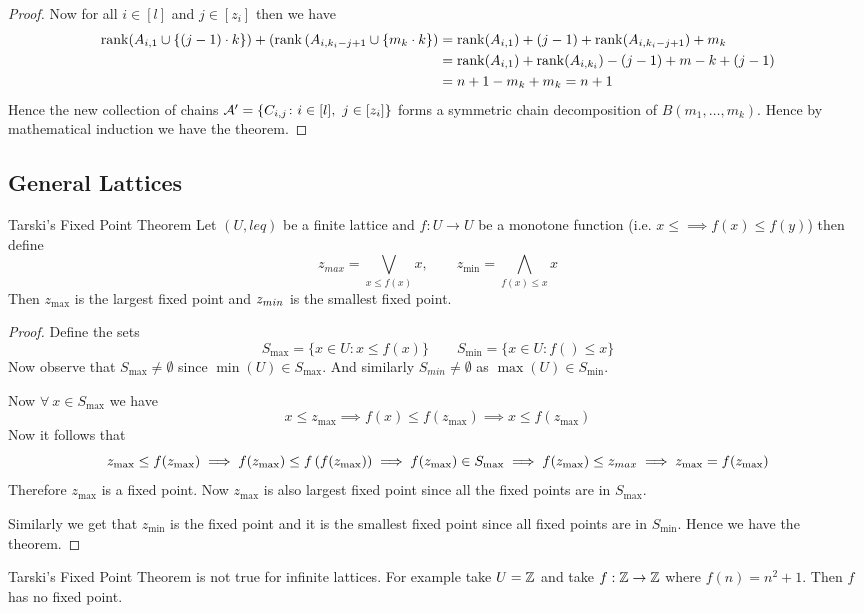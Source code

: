 \documentclass[twoside]{article}
\begin{document}
\begin{proof}
	Now for all $i\in[l]$ and  $j\in[z_i]$ then we have \begin{align*}
		\operatorname{rank}(A_{i,1}\cup\{(j-1)\cdot k\})+(\operatorname{rank} \left(A_{i,k_i-j+1}\cup\{m_k\cdot k\}\right)&= \operatorname{rank}(A_{i,1})+(j-1)+\operatorname{rank}(A_{i,k_i-j+1})+m_k\\
		& = \operatorname{rank}(A_{i,1})+\operatorname{rank}(A_{i,k_i})-(j-1)+m-k+(j-1)\\
		& = n+1-m_k+m_k=n+1
	\end{align*}\parinn
	Hence the new collection of chains $\mathcal{A}'=\{C_{i,j}\colon i\in[l],\ j\in[z_i]\}$ forms a symmetric chain decomposition of $B(m_1,\dots, m_k)$. Hence by mathematical induction we have the theorem.
\end{proof}
\subsection{General Lattices}


\begin{Theorem}{Tarski's Fixed Point Theorem}{}
	Let $(U,leq)$ be a finite lattice and $f:U\to U$ be a monotone function (i.e. $x\leq\implies f(x)\leq f(y)$) then define $$z_{max}=\bigvee_{x\leq f(x)}x,\qquad z_{\min}=\bigwedge_{f(x)\leq x}x$$Then $z_{\max}$ is the largest fixed point and $z_{\\min}$ is the smallest fixed point.
\end{Theorem}
\begin{proof}
	Define the sets $$S_{\max}=\{x\in U\colon x\leq f(x)\}\qquad S_{\min}=\{x\in U\colon f()\leq x\}$$Now observe that $S_{\max}\neq \emptyset$ since $\min(U)\in S_{\max}$. And similarly $S_{min}\neq\emptyset$ as $\max(U)\in S_{\min}$. 
	
	Now $\forall\ x\in S_{\max}$ we   have $$x\leq z_{\max}\implies f(x)\leq f(z_{\max})\implies x\leq f(z_{\max})$$Now it follows that $$z_{\max}\leq f(z_{\max})\implies f(z_{\max})\leq f\left(f(z_{\max})\right)\implies f(z_{\max})\in S_{\max} \implies f(z_{\max})\leq z_{max}\implies z_{\max}=f(z_{\max})$$Therefore $z_{\max}$ is a fixed point. Now $z_{\max}$ is also largest fixed point since all the fixed points are in $S_{\max}$.
	
	Similarly we get that $z_{\min}$ is the fixed point and it is the smallest fixed point since all fixed points are in $S_{\min}$. Hence we have the theorem. 
\end{proof}
\begin{remark}
	Tarski's Fixed Point Theorem is not true for infinite lattices. For example take $U=\mathbb{Z}$ and take $f:\mathbb{Z}\to \mathbb{Z}$ where $f(n)=n^2+1$. Then $f$ has no fixed point.
\end{remark}
\end{document}
